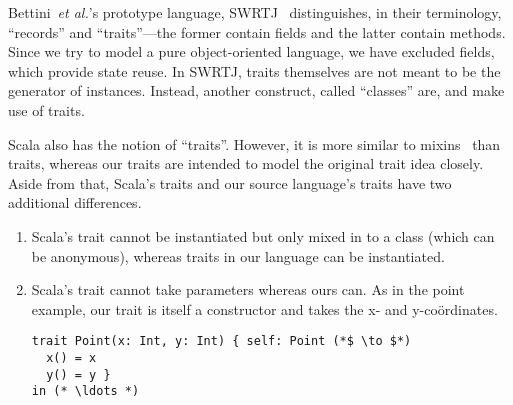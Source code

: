 Bettini~\textit{et al.}'s prototype language,
SWRTJ~\cite{bettini2010prototypical} distinguishes, in their terminology,
``records'' and ``traits''---the former contain fields and the latter contain
methods. Since we try to model a pure object-oriented language, we have excluded
fields, which provide state reuse. In SWRTJ, traits themselves are not meant to
be the generator of instances. Instead, another construct, called ``classes''
are, and make use of traits.


Scala also has the notion of ``traits''. However, it is more similar to
mixins~\cite{bracha1990mixin} than traits, whereas our traits are intended to
model the original trait idea closely. Aside from that, Scala's traits and our
source language's traits have two additional differences.

\begin{enumerate}

  \item Scala's trait cannot be instantiated but only mixed in to a class (which
  can be anonymous), whereas traits in our language can be instantiated.

  \item Scala's trait cannot take parameters whereas ours can. As in the point
  example, our trait is itself a constructor and takes the x- and y-coördinates.

\begin{lstlisting}
trait Point(x: Int, y: Int) { self: Point (*$ \to $*)
  x() = x
  y() = y }
in (* \ldots *)
\end{lstlisting}

\end{enumerate}
